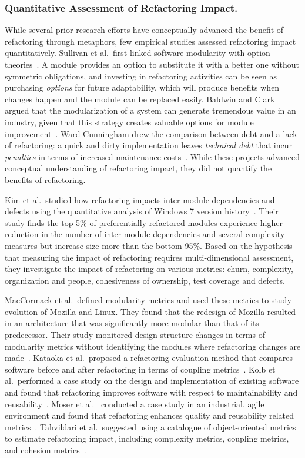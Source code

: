 \subsubsection{Quantitative Assessment of Refactoring Impact.} 
\label{sec:refactoringassessment} 
While several prior research efforts have conceptually advanced the benefit of refactoring through metaphors, few empirical studies assessed refactoring impact quantitatively. Sullivan et al.~first linked software modularity with option theories~\cite{Sullivan1998:option}. A module provides an option to substitute it with a better one without symmetric obligations, and investing in refactoring activities can be seen as purchasing \emph{options} for future adaptability, which will produce benefits when changes happen and the module can be replaced easily. Baldwin and Clark argued that the modularization of a system can generate tremendous value in an industry, given that this strategy creates valuable options for module improvement~\cite{Baldwin1999:designrule}. Ward Cunningham drew the comparison between debt and a lack of refactoring: a quick and dirty implementation leaves {\em technical debt} that incur \emph{penalties} in terms of increased maintenance costs~\cite{Cunningham1992:td}. While these projects advanced conceptual understanding of refactoring impact, they did not quantify the benefits of refactoring.  

Kim et al.~studied how refactoring impacts inter-module dependencies and defects using the quantitative analysis of Windows 7 version history~\cite{Kim2014:EmpiricalStudy}. Their study finds the top 5\% of preferentially refactored modules experience higher reduction in the number of inter-module dependencies and several complexity measures but increase size more than the bottom 95\%. Based on the hypothesis that measuring the impact of refactoring requires multi-dimensional assessment, they investigate the impact of refactoring on various metrics: churn, complexity, organization and people, cohesiveness of ownership, test coverage and defects.     

MacCormack et al.~defined modularity metrics and used these metrics to study evolution of Mozilla and Linux. They found that the redesign of Mozilla resulted in an architecture that was significantly more modular than that of its predecessor. Their study monitored design structure changes in terms of modularity metrics without identifying the modules where refactoring changes are made~\cite{MacCormack2006:study}. Kataoka et al.~proposed a refactoring evaluation method that compares software before and after refactoring in terms of coupling metrics~\cite{Kataoka2002:metric}. Kolb et al.~performed a case study on the design and implementation of existing software and found that refactoring improves software with respect to maintainability and reusability~\cite{Kolb2006:refactoring}. Moser et al.~ conducted a case study in an industrial, agile environment and found that refactoring enhances quality and reusability related metrics~\cite{Moser2006:refactoring}. Tahvildari et al.~suggested using a catalogue of object-oriented metrics to estimate refactoring impact, including complexity metrics, coupling metrics, and cohesion metrics~\cite{Tahvildari2003:MAE}. 

